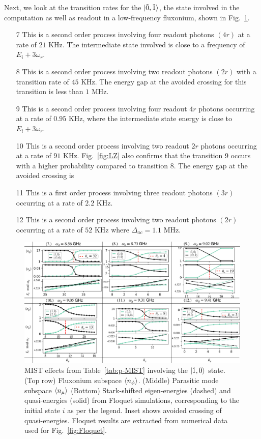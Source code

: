 \documentclass[prx,showpacs,notitlepage,twocolumn,superscriptaddress,nofootinbib,preprintnumbers,floatfix]{revtex4-2}
\begin{document}
Next, we look at the transition rates for the $\ket{\tilde{0},\tilde{1}}$, the state involved in the computation as well as readout in a low-frequency fluxonium, shown in Fig.~\ref{fig:Trans1}.
\begin{itemize}
    \item[7] This is a second order process involving four readout photons $(4r)$ at a rate of $21$ KHz. The intermediate state involved is close to a frequency of $E_i+3\omega_r$.
    \item[8] This is a second order process involving two readout photons $(2r)$ with a transition rate of $45$ KHz. The energy gap at the avoided crossing for this transition is less than $1$ MHz. 
    \item[9] This is a second order process involving four readout $4r$ photons occurring at a rate of $0.95$ KHz, where the intermediate state energy is close to $E_i+3\omega_r$. 
    \item[10] This is a second order process involving two readout $2r$ photons occurring at a rate of $91$ KHz. Fig.~\ref{fig:LZ} also confirms that the transition 9 occurs with a higher probability compared to transition 8. The energy gap at the avoided crossing is
    \item[11] This is a first order process involving three readout photons $(3r)$ occurring at a rate of $2.2$ KHz. 
    \item[12] This is a second order process involving two readout photons $(2r)$ occurring at a rate of $52$ KHz where $\Delta_{ac}=1.1$ MHz.
\end{itemize}
\begin{figure}
    \centering
    \includegraphics[width=1.0\textwidth]{Figures/Trans1.pdf}
    \caption{MIST effects from Table~\ref{tab:p-MIST} involving the $\ket{\tilde{1},\tilde{0}}$ state. (Top row) Fluxonium subspace $\braket{n_\phi}$. (Middle) Parasitic mode subspace $\braket{n_\mu}$ (Bottom) Stark-shifted eigen-energies (dashed) and quasi-energies (solid) from Floquet simulations, corresponding to the initial state $i$ as per the legend. Inset shows avoided crossing of quasi-energies. Floquet results are extracted from numerical data used for Fig.~\ref{fig:Floquet}.}
    \label{fig:Trans1}
\end{figure}
\end{document}
